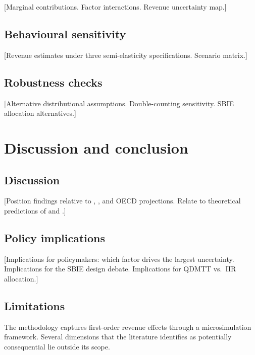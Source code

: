 \documentclass[11pt,a4paper]{article}
\begin{document}
[Marginal contributions. Factor interactions. Revenue uncertainty map.]

\subsection{Behavioural sensitivity}\label{sec:behav_results}

[Revenue estimates under three semi-elasticity specifications. Scenario matrix.]

\subsection{Robustness checks}\label{sec:robustness}

[Alternative distributional assumptions. Double-counting sensitivity. SBIE allocation alternatives.]


\newpage
\section{Discussion and conclusion}\label{sec:discussion}

\subsection{Discussion}\label{sec:discussion_main}

[Position findings relative to \citet{barake2022}, \citet{hugger2026}, and OECD projections. Relate to theoretical predictions of \citet{schjelderup2024} and \citet{johannesen2022}.]

\subsection{Policy implications}\label{sec:implications}

[Implications for policymakers: which factor drives the largest uncertainty. Implications for the SBIE design debate. Implications for QDMTT vs.\ IIR allocation.]

\subsection{Limitations}\label{sec:limitations}

The methodology captures first-order revenue effects through a microsimulation framework. Several dimensions that the literature identifies as potentially consequential lie outside its scope.
\end{document}
